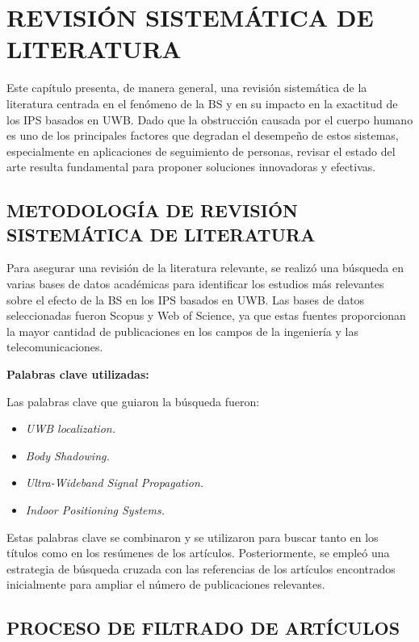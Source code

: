 \chapter{REVISIÓN SISTEMÁTICA DE LITERATURA}
\label{ch:revision} %

Este capítulo presenta, de manera general, una revisión sistemática de la literatura centrada en el fenómeno de la BS y en su impacto en la exactitud de los IPS basados en UWB. Dado que la obstrucción causada por el cuerpo humano es uno de los principales factores que degradan el desempeño de estos sistemas, especialmente en aplicaciones de seguimiento de personas, revisar el estado del arte resulta fundamental para proponer soluciones innovadoras y efectivas.

\section{METODOLOGÍA DE REVISIÓN SISTEMÁTICA DE LITERATURA}
\label{sec:metodologia_revision}

Para asegurar una revisión de la literatura relevante, se realizó una búsqueda en varias bases de datos académicas para identificar los estudios más relevantes sobre el efecto de la BS en los IPS basados en UWB. Las bases de datos seleccionadas fueron Scopus y Web of Science, ya que estas fuentes proporcionan la mayor cantidad de publicaciones en los campos de la ingeniería y las telecomunicaciones.


\textbf{Palabras clave utilizadas:}

Las palabras clave que guiaron la búsqueda fueron:
\begin{itemize}
    \item \textit{UWB localization.}
    \item \textit{Body Shadowing.}
    \item \textit{Ultra-Wideband Signal Propagation.}
    \item \textit{Indoor Positioning Systems.}
\end{itemize}
Estas palabras clave se combinaron y se utilizaron para buscar tanto en los títulos como en los resúmenes de los artículos. Posteriormente, se empleó una estrategia de búsqueda cruzada con las referencias de los artículos encontrados inicialmente para ampliar el número de publicaciones relevantes.

\section{PROCESO DE FILTRADO DE ARTÍCULOS}
\label{sec:filtrado}

